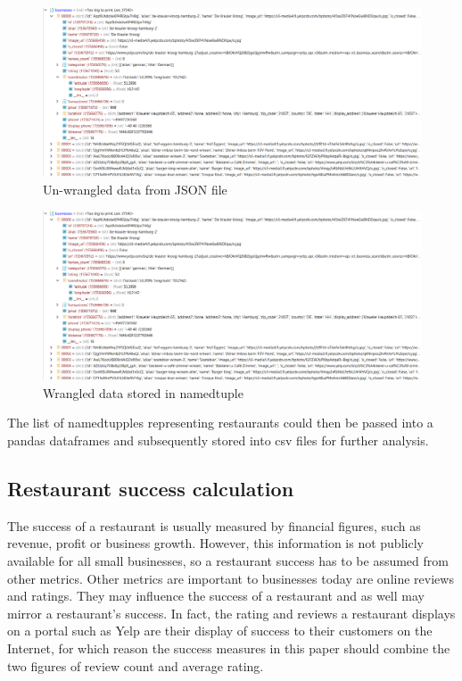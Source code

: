 \documentclass[a4paper, 11pt, oneside]{Thesis}  %
\begin{document}
\begin{figure}[h]
\includegraphics[scale=0.4]{Figures/restaurants_unwrangled.png}
\centering
\caption{Un-wrangled data from JSON file}
\label{fig:un-wrangled data from JSON file}
\end{figure}

\begin{figure}[h]
\includegraphics[scale=0.4]{Figures/restaurants_unwrangled.png}
\centering
\caption{Wrangled data stored in namedtuple}
\label{fig:wranged data stored in namedtuple}
\end{figure}

The list of namedtupples representing restaurants could then be passed into a pandas dataframes and subsequently stored into \ac{csv} files for further analysis.


\subsection{Restaurant success calculation}

The success of a restaurant is usually measured by financial figures, such as revenue, profit or business growth. However, this information is not publicly available for all small businesses, so a restaurant success has to be assumed from other metrics. Other metrics are important to businesses today are online reviews and ratings. They may influence the success of a restaurant and as well may mirror a restaurant's success. In fact, the rating and reviews a restaurant displays on a portal such as Yelp are
 their display of success to their customers on the Internet, for which reason the success measures in this paper should combine the two figures of review count and average rating.
\end{document}
